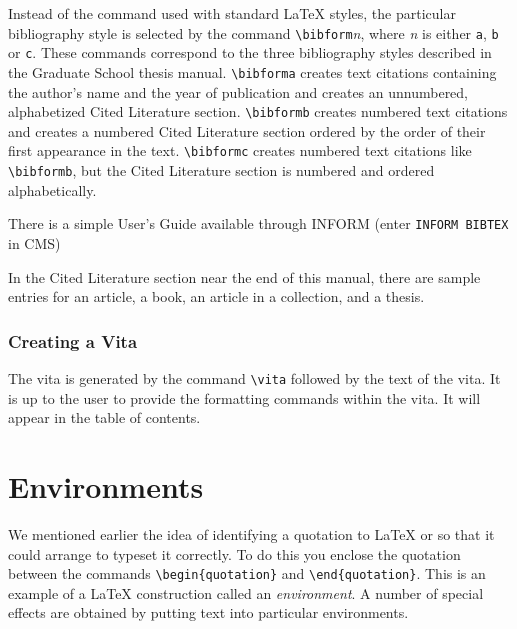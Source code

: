 Instead of the \verb++ command used with standard
\LaTeX{} styles,
the particular bibliography style is selected by the command
\verb+\bibform+{\it n}, where {\it n} is either \verb+a+, \verb+b+
or \verb+c+.
These commands correspond to the three bibliography styles described
in the Graduate School thesis manual\cite{thesis_dir}.
\verb+\bibforma+ creates text citations containing the author's name
and the year of publication and creates an unnumbered, alphabetized
Cited Literature section.
\verb+\bibformb+ creates numbered text citations and creates a
numbered Cited Literature section ordered by the order of their first
appearance in the text.
\verb+\bibformc+ creates numbered text citations like \verb+\bibformb+,
but the Cited Literature section is numbered and ordered alphabetically.
 
There is a simple \BibTeX{} User's Guide available through INFORM
(enter {\tt INFORM BIBTEX} in CMS)
 
In the Cited Literature section near the end of this manual,
there are sample entries for an article\cite{smpl_article}, a
book\cite{smpl_book}, an article in a
collection\cite{smpl_incollection}, and
a thesis\cite{smpl_masterthesis}.
 
\subsection{Creating a Vita}
The vita is generated by the command \verb+\vita+
followed by the text of the vita.
It is up to the user to provide the formatting commands within the vita.
It will appear in the table of contents.
 
\chapter{Environments}
We mentioned earlier the idea of identifying a quotation to \LaTeX{} or
\uicthesi{} so that
it could arrange to typeset it correctly. To do this you enclose the
quotation between the commands \verb|\begin{quotation}| and
\verb|\end{quotation}|.
This is an example of a \LaTeX{} construction called an {\em environment\/}.
A number of
special effects are obtained by putting text into particular environments.
 

